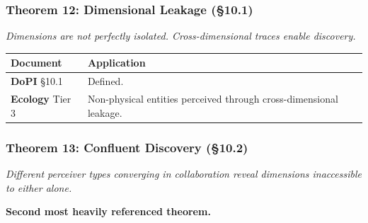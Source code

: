 \subsubsection*{Theorem 12: Dimensional Leakage (§10.1)}


\textit{Dimensions are not perfectly isolated. Cross-dimensional traces enable discovery.}



\begin{longtable}{>{\raggedright\arraybackslash}p{} >{\raggedright\arraybackslash}p{}}
\toprule
\textbf{Document} & \textbf{Application} \\
\midrule
\endhead
\textbf{DoPI} §10.1 & Defined. \\
\textbf{Ecology} Tier 3 & Non-physical entities perceived through cross-dimensional leakage. \\
\bottomrule
\end{longtable}



\subsubsection*{Theorem 13: Confluent Discovery (§10.2)}


\textit{Different perceiver types converging in collaboration reveal dimensions inaccessible to either alone.}


\textbf{Second most heavily referenced theorem.}



